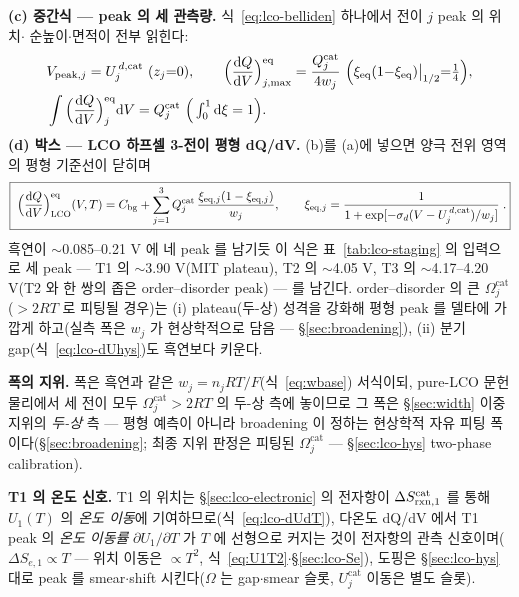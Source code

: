\textbf{(c) 중간식 --- peak 의 세 관측량.} 식~\eqref{eq:lco-belliden} 하나에서 전이 $j$ peak 의 위치$\cdot$
순높이$\cdot$면적이 전부 읽힌다:
\begin{equation}
\begin{aligned}
&V_{\mathrm{peak},j}=U_j^{\,d,\mathrm{cat}}\ (z_j{=}0),\qquad
\Big(\frac{\dd Q}{\dd V}\Big)^{\eq}_{j,\max}=\frac{Q_j^\mathrm{cat}}{4w_j}\ \Big(\xi_\eq(1{-}\xi_\eq)\big|_{1/2}{=}\tfrac14\Big),\\
&\int\Big(\frac{\dd Q}{\dd V}\Big)^{\eq}_{j}\dd V=Q_j^\mathrm{cat}\ \Big(\textstyle\int_0^1\dd\xi=1\Big).
\end{aligned}
\label{eq:lco-peakobs}
\end{equation}
\textbf{(d) 박스 --- LCO 하프셀 3-전이 평형 dQ/dV.} (b)를 (a)에 넣으면 양극 전위 영역의 평형 기준선이 닫히며
\begin{equation}
\boxed{\;\Big(\frac{\mathrm{d} Q}{\mathrm{d} V}\Big)^{\mathrm{eq}}_\mathrm{LCO}(V,T)
=C_{\mathrm{bg}}+\sum_{j=1}^{3}Q_j^\mathrm{cat}\,
\frac{\xi_{\mathrm{eq},j}(1-\xi_{\mathrm{eq},j})}{w_j},
\qquad \xi_{\mathrm{eq},j}=\frac{1}{1+\exp[-\sigma_d(V-U_j^{\,d,\mathrm{cat}})/w_j]}\;.}
\label{eq:lco-eqpeak}
\end{equation}
흑연이 $\sim$0.085--0.21 V 에 네 peak 를 남기듯 이 식은 표~\ref{tab:lco-staging} 의 입력으로 세 peak ---
T1 의 $\sim$3.90 V(MIT plateau), T2 의 $\sim$4.05 V, T3 의 $\sim$4.17--4.20 V(T2 와 한 쌍의 좁은
order--disorder peak) --- 를 남긴다. order--disorder 의 큰 $\Omega_j^\mathrm{cat}$($>2RT$ 로 피팅될 경우)는
(i) plateau(두-상) 성격을 강화해 평형 peak 를 델타에 가깝게 하고(실측 폭은 $w_j$ 가 현상학적으로 담음 ---
\S\ref{sec:broadening}), (ii) 분기 gap(식~\eqref{eq:lco-dUhys})도 흑연보다 키운다.

\textbf{폭의 지위.} 폭은 흑연과 같은 $w_j=n_jRT/F$(식~\eqref{eq:wbase}) 서식이되, pure-LCO 문헌 물리에서 세
전이 모두 $\Omega_j^\mathrm{cat}>2RT$ 의 두-상 측에 놓이므로 그 폭은 \S\ref{sec:width} 이중지위의
\emph{두-상} 측 --- 평형 예측이 아니라 broadening 이 정하는 현상학적 자유 피팅 폭이다(\S\ref{sec:broadening};
최종 지위 판정은 피팅된 $\Omega_j^\mathrm{cat}$ --- \S\ref{sec:lco-hys} two-phase calibration).

\textbf{T1 의 온도 신호.} T1 의 위치는 \S\ref{sec:lco-electronic} 의 전자항이 $\Delta S_{\mathrm{rxn},1}^\mathrm{cat}$ 를 통해 $U_1(T)$ 의
\emph{온도 이동}에 기여하므로(식~\eqref{eq:lco-dUdT}), 다온도 dQ/dV 에서 T1 peak 의 \emph{온도 이동률}
$\partial U_1/\partial T$ 가 $T$ 에 선형으로 커지는 것이 전자항의 관측 신호이며($\Delta S_{e,1}\propto T$ ---
위치 이동은 $\propto T^2$, 식~\eqref{eq:U1T2}$\cdot$\S\ref{sec:lco-Se}), 도핑은 \S\ref{sec:lco-hys} 대로 peak 를 smear$\cdot$shift 시킨다($\Omega$ 는
gap$\cdot$smear 슬롯, $U_j^\mathrm{cat}$ 이동은 별도 슬롯).

